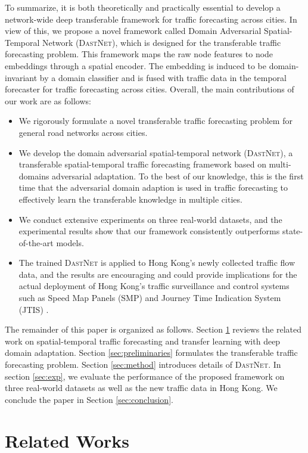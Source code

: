 \documentclass[sigconf]{acmart}
\theoremstyle{definition}
\begin{document}
To summarize, it is both theoretically and practically essential to develop a network-wide deep transferable framework for traffic forecasting across cities. 
In view of this, we propose a novel framework called Domain Adversarial Spatial-Temporal Network (\textsc{DastNet}), which is designed for the transferable traffic forecasting problem. 
This framework maps the raw node features to node embeddings through a spatial encoder. The embedding is induced to be domain-invariant by a domain classifier and is fused with traffic data in the temporal forecaster for traffic forecasting across cities. Overall, the main contributions of our work are as follows:
\begin{itemize}[leftmargin=*]
    \item We rigorously formulate a novel transferable traffic forecasting problem for general road networks across cities.
    \item We develop the domain adversarial spatial-temporal network (\textsc{DastNet}), a transferable spatial-temporal traffic forecasting framework based on multi-domains adversarial adaptation. To the best of our knowledge, this is the first time that the adversarial domain adaption is used in traffic forecasting to effectively learn the transferable knowledge in multiple cities.\item We conduct extensive experiments on three real-world datasets, and the experimental results show that our framework consistently outperforms state-of-the-art models.\item The trained \textsc{DastNet} is applied to Hong Kong's newly collected traffic flow data, and the results are encouraging and could provide implications for the actual deployment of Hong Kong's traffic surveillance and control systems such as Speed Map Panels (SMP) and Journey Time Indication System (JTIS) \cite{tam2011application}. 
\end{itemize}
The remainder of this paper is organized as follows. Section \ref{sec:relatedworks} reviews the related work on spatial-temporal traffic forecasting and transfer learning with deep domain adaptation. Section \ref{sec:preliminaries} formulates the transferable traffic forecasting problem. Section \ref{sec:method} introduces details of \textsc{DastNet}. In section \ref{sec:exp}, we evaluate the performance of the proposed framework on three real-world datasets as well as the new traffic data in Hong Kong. We conclude the paper in Section \ref{sec:conclusion}.


\section{Related Works}\label{sec:relatedworks}
\end{document}
